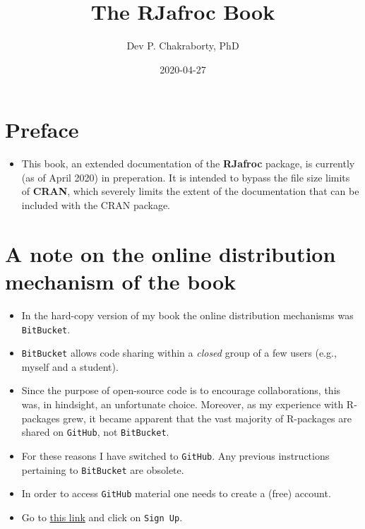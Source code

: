 \documentclass[
]{book}
\title{The RJafroc Book}
\author{Dev P. Chakraborty, PhD}
\date{2020-04-27}
\providecommand{\tightlist}{%
  \setlength{\itemsep}{0pt}\setlength{\parskip}{0pt}}
\begin{document}
\maketitle

{
\setcounter{tocdepth}{1}
\tableofcontents
}
\hypertarget{preface}{%
\chapter*{Preface}\label{preface}}

\begin{itemize}
\tightlist
\item
  This book, an extended documentation of the \textbf{RJafroc} package, is currently (as of April 2020) in preperation. It is intended to bypass the file size limits of \textbf{CRAN}, which severely limits the extent of the documentation that can be included with the CRAN package.
\end{itemize}

\hypertarget{a-note-on-the-online-distribution-mechanism-of-the-book}{%
\chapter*{A note on the online distribution mechanism of the book}\label{a-note-on-the-online-distribution-mechanism-of-the-book}}

\begin{itemize}
\tightlist
\item
  In the hard-copy version of my book \citep{RN2680} the online distribution mechanisms was \texttt{BitBucket}.
\item
  \texttt{BitBucket} allows code sharing within a \emph{closed} group of a few users (e.g., myself and a student).
\item
  Since the purpose of open-source code is to encourage collaborations, this was, in hindsight, an unfortunate choice. Moreover, as my experience with R-packages grew, it became apparent that the vast majority of R-packages are shared on \texttt{GitHub}, not \texttt{BitBucket}.
\item
  For these reasons I have switched to \texttt{GitHub}. Any previous instructions pertaining to \texttt{BitBucket} are obsolete.
\item
  In order to access \texttt{GitHub} material one needs to create a (free) account.
\item
  Go to \href{https://github.com}{this link} and click on \texttt{Sign\ Up}.
\end{itemize}
\end{document}
